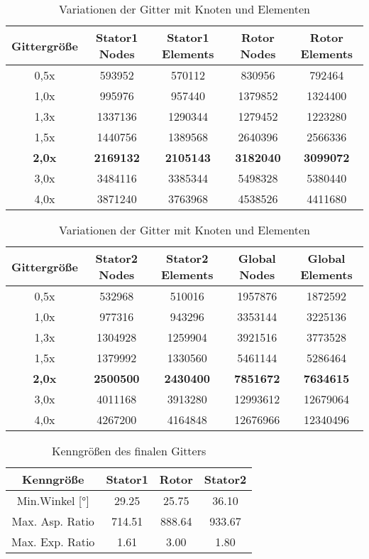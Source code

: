 \begin{table}[H]
\centering
\begin{tabular}[t]{ccccc}
\toprule
Gittergröße	& Stator1 Nodes &	Stator1 Elements & 	Rotor Nodes &	Rotor Elements  \\
\midrule

0,5x 	& 593952	& 570112 &	830956	& 792464 \\
1,0x   &	995976	& 957440	&1379852	& 1324400\\
1,3x	  & 1337136	&1290344	&1279452	&1223280\\
1,5x 	&1440756	&1389568	&2640396	&2566336\\
\textbf{2,0x  }	&\textbf{2169132}	&\textbf{2105143}	&\textbf{3182040}&	\textbf{3099072}\\
3,0x  	&3484116	&3385344&	5498328	&5380440\\
4,0x 	& 3871240 &	3763968	&4538526&	4411680\\

\bottomrule
\end{tabular}

\begin{tabular}[t]{ccccc}
\toprule
Gittergröße	& Stator2 Nodes &	Stator2 Elements & 	Global Nodes &	Global Elements  \\
\midrule
0,5x 	& 532968	& 510016 &	1957876	& 1872592 \\
1,0x   &	977316	& 943296	&3353144	& 3225136 \\
1,3x	  & 1304928	&1259904	&3921516	&3773528\\
1,5x 	&1379992	&1330560	&5461144	&5286464\\
\textbf{2,0x  }	&\textbf{2500500}	&\textbf{2430400}	&\textbf{7851672}&	\textbf{7634615}\\
3,0x  	&4011168	&3913280&	12993612	&12679064\\
4,0x 	& 4267200 &	4164848	&12676966&	12340496\\

\bottomrule
\end{tabular}
\caption{Variationen der Gitter mit Knoten und Elementen} \label{tab:Gittergroessen}
\end{table}

\begin{table}[H]
\centering


\begin{tabular}[t]{cccc}
\toprule
Kenngröße	& Stator1 & Rotor &	Stator2  \\
\midrule
Min.Winkel [°]	& 29.25	& 25.75 & 36.10 \\
Max. Asp. Ratio   &	714.51	& 888.64	& 933.67 \\
Max. Exp. Ratio	  & 1.61	& 3.00	&1.80 \\


\bottomrule
\end{tabular}
\caption{Kenngrößen des finalen Gitters} \label{tab:KenngroessenGitterFinal}
\end{table}


